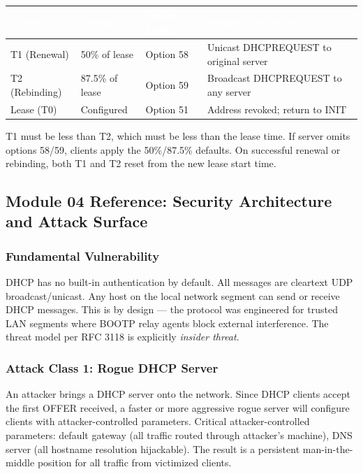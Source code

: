 \documentclass[11pt,letterpaper]{article}
\newcommand{\tableheader}[1]{\textbf{\sffamily\textcolor{white}{#1}}}
\begin{document}
\begin{center}
\begin{tabularx}{\textwidth}{L{2cm}C{2.5cm}C{2.5cm}X}
\toprule
{}
\tableheader{Timer} & \tableheader{Default \%} & \tableheader{Option Code} & \tableheader{Behavior on Expiry} \\
\midrule
T1 (Renewal) & 50\% of lease & Option 58 & Unicast DHCPREQUEST to original server \\
T2 (Rebinding) & 87.5\% of lease & Option 59 & Broadcast DHCPREQUEST to any server \\
Lease (T0) & Configured & Option 51 & Address revoked; return to INIT \\
\bottomrule
\end{tabularx}
\end{center}

T1 must be less than T2, which must be less than the lease time. If server omits options 58/59, clients apply the 50\%/87.5\% defaults. On successful renewal or rebinding, both T1 and T2 reset from the new lease start time.

\subsection{Module 04 Reference: Security Architecture and Attack Surface}

\subsubsection{Fundamental Vulnerability}

DHCP has no built-in authentication by default. All messages are cleartext UDP broadcast/unicast. Any host on the local network segment can send or receive DHCP messages. This is by design --- the protocol was engineered for trusted LAN segments where BOOTP relay agents block external interference. The threat model per RFC 3118 is explicitly \textit{insider threat}.

\subsubsection{Attack Class 1: Rogue DHCP Server}

An attacker brings a DHCP server onto the network. Since DHCP clients accept the first OFFER received, a faster or more aggressive rogue server will configure clients with attacker-controlled parameters. Critical attacker-controlled parameters: default gateway (all traffic routed through attacker's machine), DNS server (all hostname resolution hijackable). The result is a persistent man-in-the-middle position for all traffic from victimized clients.
\end{document}
